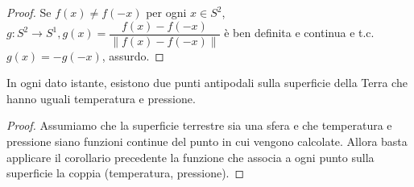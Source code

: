 \begin{proof}
  Se $f(x) \not=f(-x)$ per ogni $x \in S^2$, $g:S^2 \rightarrow S^1, g(x)=\dfrac{f(x)-f(-x)}{\|f(x)-f(-x)\|}$ è ben definita e continua e t.c. $g(x)=-g(-x)$, assurdo.
\end{proof}

\begin{cor}
  In ogni dato istante, esistono due punti antipodali sulla superficie della Terra che hanno uguali temperatura e pressione.
\end{cor}

\begin{proof}
  Assumiamo che la superficie terrestre sia una sfera e che temperatura e pressione siano funzioni continue del punto in cui vengono calcolate. Allora basta applicare il corollario precedente la funzione che associa a ogni punto sulla superficie la coppia (temperatura, pressione).
\end{proof}
